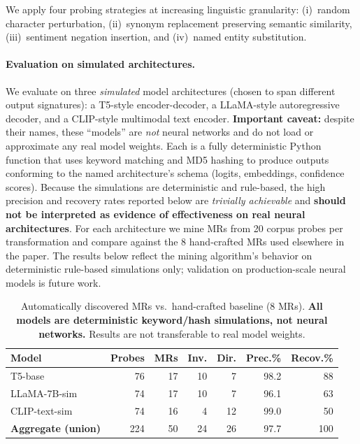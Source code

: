 \documentclass[sigconf,nonacm]{acmart}
\begin{document}
We apply four probing strategies at increasing linguistic granularity: (i)~random character perturbation, (ii)~synonym replacement preserving semantic similarity, (iii)~sentiment negation insertion, and (iv)~named entity substitution.

\paragraph{Evaluation on simulated architectures.}
We evaluate on three \emph{simulated} model architectures (chosen to span different output signatures): a T5-style encoder-decoder, a LLaMA-style autoregressive decoder, and a CLIP-style multimodal text encoder.
\textbf{Important caveat:} despite their names, these ``models'' are \emph{not} neural networks and do not load or approximate any real model weights.
Each is a fully deterministic Python function that uses keyword matching and MD5 hashing to produce outputs conforming to the named architecture's schema (logits, embeddings, confidence scores).
Because the simulations are deterministic and rule-based, the high precision and recovery rates reported below are \emph{trivially achievable} and \textbf{should not be interpreted as evidence of effectiveness on real neural architectures}.
For each architecture we mine MRs from 20 corpus probes per transformation and compare against the 8 hand-crafted MRs used elsewhere in the paper.
The results below reflect the mining algorithm's behavior on deterministic rule-based simulations only; validation on production-scale neural models is future work.

\begin{table}[H]
\centering
\caption{Automatically discovered MRs vs.\ hand-crafted baseline (8 MRs). \textbf{All models are deterministic keyword/hash simulations, not neural networks.} Results are not transferable to real model weights.}
\label{tab:auto-mr}
\begin{tabular}{@{}lrrrrrr@{}}
\toprule
\textbf{Model} & \textbf{Probes} & \textbf{MRs} & \textbf{Inv.} & \textbf{Dir.} & \textbf{Prec.\%} & \textbf{Recov.\%} \\
\midrule
T5-base         & 76  & 17 & 10 & 7  & 98.2 & 88 \\
LLaMA-7B-sim    & 74  & 17 & 10 & 7  & 96.1 & 63 \\
CLIP-text-sim   & 74  & 16 &  4 & 12 & 99.0 & 50 \\
\midrule
\textbf{Aggregate (union)} & 224 & 50 & 24 & 26 & 97.7 & 100 \\
\bottomrule
\end{tabular}
\end{table}
\end{document}
